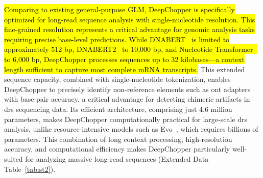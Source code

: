 \documentclass[pdflatex,sn-nature, lineno]{sn-jnl}%
\newcommand{\edtableref}[2]{Extended Data Table~\hyperref[#1]{\ref*{#1}#2}}
\begin{document}
\hl{Comparing to existing general-purpose GLM, DeepChopper is specifically optimized for long-read sequence analysis with single-nucleotide resolution.
    This fine-grained resolution represents a critical advantage for genomic analysis tasks requiring precise base-level predictions.
    While DNABERT\mbox{~\cite{ji2021dnabert}} is limited to approximately 512 bp, DNABERT2\mbox{~\cite{zhou2023dnabert2}} to 10,000 bp, and Nucleotide Transformer\mbox{~\cite{dalla2023nucleotide}} to 6,000 bp, DeepChopper processes sequences up to 32 kilobases—a context length sufficient to capture most complete mRNA transcripts.}
This extended sequence capacity, combined with single-nucleotide tokenization, enables DeepChopper to precisely identify non-reference elements such as \gls{ont} adapters with base-pair accuracy, a critical advantage for detecting chimeric artifacts in \gls{drs} sequencing data.
Its efficient architecture, comprising just 4.6 million parameters, makes DeepChopper computationally practical for large-scale \gls{drs} analysis, unlike resource-intensive models such as Evo~\cite{nguyen2024sequence}, which requires billions of parameters.
This combination of long context processing, high-resolution accuracy, and computational efficiency makes DeepChopper particularly well-suited for analyzing massive long-read sequences (\edtableref{tab:st2}{}).
\end{document}

